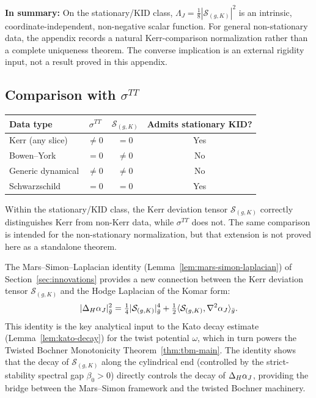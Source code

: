 \textbf{In summary:} On the stationary/KID class, $\Lambda_J = \frac{1}{8}|\mathcal{S}_{(g,K)}|^2$ is an intrinsic, coordinate-independent, non-negative scalar function. For general non-stationary data, the appendix records a natural Kerr-comparison normalization rather than a complete uniqueness theorem. The converse implication is an external rigidity input, not a result proved in this appendix.

\subsection{Comparison with \texorpdfstring{$\sigma^{TT}$}{sigma TT}}

\begin{center}
\begin{tabular}{lccc}
\toprule
\textbf{Data type} & $\sigma^{TT}$ & $\mathcal{S}_{(g,K)}$ & Admits stationary KID? \\
\midrule
Kerr (any slice) & $\neq 0$ & $= 0$ & Yes \\
Bowen--York & $= 0$ & $\neq 0$ & No \\
Generic dynamical & $\neq 0$ & $\neq 0$ & No \\
Schwarzschild & $= 0$ & $= 0$ & Yes \\
\bottomrule
\end{tabular}
\end{center}

Within the stationary/KID class, the Kerr deviation tensor $\mathcal{S}_{(g,K)}$ correctly distinguishes Kerr from non-Kerr data, while $\sigma^{TT}$ does not. The same comparison is intended for the non-stationary normalization, but that extension is not proved here as a standalone theorem.

\begin{remark}
The Mars--Simon--Laplacian identity (Lemma~\ref{lem:mars-simon-laplacian}) of Section~\ref{sec:innovations} provides a new connection between the Kerr deviation tensor $\mathcal{S}_{(g,K)}$ and the Hodge Laplacian of the Komar form:
\begin{equation}
|\Delta_H \alpha_J|_{\bar{g}}^2 = \tfrac{1}{4}|\mathcal{S}_{(g,K)}|_{\bar{g}}^4 + \tfrac{1}{2}\langle \mathcal{S}_{(g,K)}, \nabla^2 \alpha_J \rangle_{\bar{g}}.
\end{equation}
This identity is the key analytical input to the Kato decay estimate (Lemma~\ref{lem:kato-decay}) for the twist potential $\omega$, which in turn powers the Twisted Bochner Monotonicity Theorem~\ref{thm:tbm-main}. The identity shows that the decay of $\mathcal{S}_{(g,K)}$ along the cylindrical end (controlled by the strict-stability spectral gap $\beta_0 > 0$) directly controls the decay of $\Delta_H \alpha_J$, providing the bridge between the Mars--Simon framework and the twisted Bochner machinery.
\end{remark}
